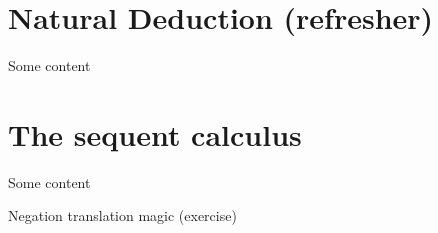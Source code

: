 %
\chapter{Natural Deduction (refresher)}
%
Some content
%
\chapter{The sequent calculus}
%
Some content

\bigskip
Negation translation magic (exercise)
